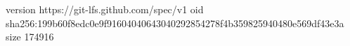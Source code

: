 version https://git-lfs.github.com/spec/v1
oid sha256:199b60f8edc0e9f91604040643040292854278f4b359825940480e569df43e3a
size 174916
